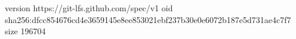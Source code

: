 version https://git-lfs.github.com/spec/v1
oid sha256:dfcc854676cd4e3659145e8ee853021ebf237b30e0e6072b187e5d731ae4c7f7
size 196704
